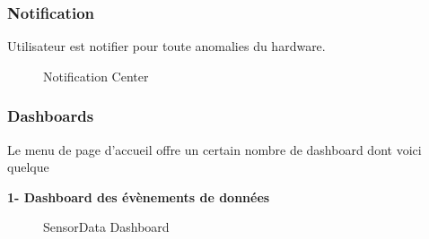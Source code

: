 \subsubsection{Notification}
Utilisateur est  notifier pour toute anomalies du hardware.
\begin{figure}[hbt]
\centering
\right
\label{fig:Notification}

  \caption{Notification Center}
\end{figure}

\newpage
\subsubsection{Dashboards}
Le menu de page d’accueil offre un certain nombre de dashboard dont voici quelque 

\textbf{1-  Dashboard des évènements de données}

\begin{figure}[hbt]
\centering
\right
\label{fig: SensorData Dashboard}

  \caption{SensorData Dashboard}
\end{figure}

